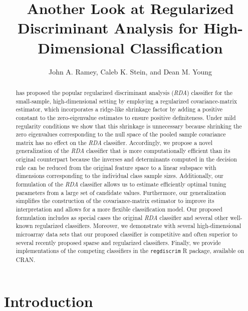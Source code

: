 \documentclass[11pt]{article}
\title{Another Look at Regularized Discriminant Analysis for High-Dimensional Classification}
\author{John A. Ramey, Caleb K. Stein, and Dean M. Young}
\begin{document}
\newtheorem{cor}{Corollary}
\newtheorem{lemma}{Lemma}
\newtheorem{proposition}{Proposition}
\newtheorem{thm}{Theorem}


\doublespacing

\maketitle

\begin{abstract}
\cite{Friedman:1989tm} has proposed the popular regularized discriminant analysis (\emph{RDA}) classifier for the small-sample, high-dimensional setting by employing a regularized covariance-matrix estimator, which incorporates a ridge-like shrinkage factor by adding a positive constant to the zero-eigenvalue estimates to ensure positive definiteness. Under mild regularity conditions we show that this shrinkage is unnecessary because shrinking the zero eigenvalues corresponding to the null space of the pooled sample covariance matrix has no effect on the \emph{RDA} classifier. Accordingly, we propose a novel generalization of the \emph{RDA} classifier that is more computationally efficient than its original counterpart because the inverses and determinants computed in the decision rule can be reduced from the original feature space to a linear subspace with dimensions corresponding to the individual class sample sizes. Additionally, our formulation of the \emph{RDA} classifier allows us to estimate efficiently optimal tuning parameters from a large set of candidate values. Furthermore, our generalization simplifies the construction of the covariance-matrix estimator to improve its interpretation and allows for a more flexible classification model. Our proposed formulation includes as special cases the original \emph{RDA} classifier and several other well-known regularized classifiers. Moreover, we demonstrate with several high-dimensional microarray data sets that our proposed classifier is competitive and often superior to several recently proposed sparse and regularized classifiers. Finally, we provide implementations of the competing classifiers in the {\tt regdiscrim} R package, available on CRAN.
\end{abstract}

\section{Introduction}
\end{document}

